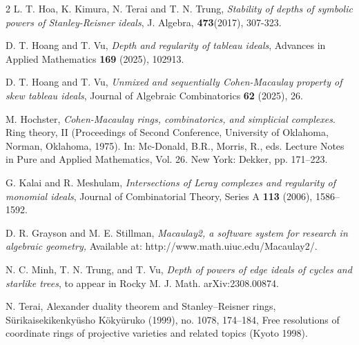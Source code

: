 \documentclass[12pt,amscd]{amsart}
\theoremstyle{definition}
\numberwithin{equation}{section}
\begin{document}
\begin{thebibliography}{2}
 L. T. Hoa, K. Kimura, N. Terai and T. N. Trung, {\it Stability of depths of symbolic powers of Stanley-Reisner ideals}, J. Algebra, {\bf 473}(2017), 307-323. 


 D. T. Hoang and T. Vu, 
{\em Depth and regularity of tableau ideals},  Advances in Applied Mathematics {\bf 169} (2025), 102913.

 D. T. Hoang and T. Vu, 
{\em Unmixed and sequentially Cohen-Macaulay property of skew tableau ideals}, Journal of Algebraic Combinatorics {\bf 62} (2025), 26.


M. Hochster, 
{\em Cohen-Macaulay rings, combinatorics, and simplicial complexes}. 
Ring theory, II (Proceedings of Second Conference, University of Oklahoma, Norman, Oklahoma, 1975). In: Mc-Donald, B.R., Morris, R., eds. Lecture Notes in Pure and Applied Mathematics, Vol. 26. New York: Dekker, pp. 171–223. 

	

  G. Kalai and R. Meshulam, \emph{Intersections of Leray complexes and regularity of monomial ideals}, Journal of Combinatorial Theory, Series A {\bf 113} (2006), 1586--1592.

 
D. R. Grayson and M. E. Stillman,
{\em Macaulay2, a software system for research in algebraic geometry,}
Available at: http://www.math.uiuc.edu/Macaulay2/.


 N. C. Minh, T. N. Trung, and T. Vu, {\em Depth of powers of edge ideals of cycles and starlike trees}, to appear in Rocky M. J. Math. arXiv:2308.00874.

 
 N. Terai, Alexander duality theorem and Stanley--Reisner rings,
S\"urikaisekikenky\"usho K\"oky\"uruko (1999), no. 1078, 174–184, Free resolutions of coordinate rings of projective varieties and related topics (Kyoto 1998).


\end{thebibliography}
\end{document}
